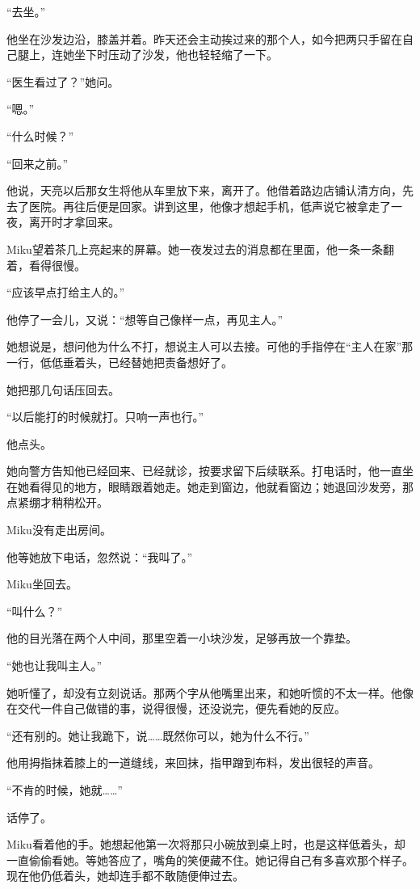 “去坐。”

他坐在沙发边沿，膝盖并着。昨天还会主动挨过来的那个人，如今把两只手留在自己腿上，连她坐下时压动了沙发，他也轻轻缩了一下。

“医生看过了？”她问。

“嗯。”

“什么时候？”

“回来之前。”

他说，天亮以后那女生将他从车里放下来，离开了。他借着路边店铺认清方向，先去了医院。再往后便是回家。讲到这里，他像才想起手机，低声说它被拿走了一夜，离开时才拿回来。

Miku望着茶几上亮起来的屏幕。她一夜发过去的消息都在里面，他一条一条翻着，看得很慢。

“应该早点打给主人的。”

他停了一会儿，又说：“想等自己像样一点，再见主人。”

她想说是，想问他为什么不打，想说主人可以去接。可他的手指停在“主人在家”那一行，低低垂着头，已经替她把责备想好了。

她把那几句话压回去。

“以后能打的时候就打。只响一声也行。”

他点头。

她向警方告知他已经回来、已经就诊，按要求留下后续联系。打电话时，他一直坐在她看得见的地方，眼睛跟着她走。她走到窗边，他就看窗边；她退回沙发旁，那点紧绷才稍稍松开。

Miku没有走出房间。

\SceneBreak

他等她放下电话，忽然说：“我叫了。”

Miku坐回去。

“叫什么？”

他的目光落在两个人中间，那里空着一小块沙发，足够再放一个靠垫。

“她也让我叫主人。”

她听懂了，却没有立刻说话。那两个字从他嘴里出来，和她听惯的不太一样。他像在交代一件自己做错的事，说得很慢，还没说完，便先看她的反应。

“还有别的。她让我跪下，说……既然你可以，她为什么不行。”

他用拇指抹着膝上的一道缝线，来回抹，指甲蹭到布料，发出很轻的声音。

“不肯的时候，她就……”

话停了。

Miku看着他的手。她想起他第一次将那只小碗放到桌上时，也是这样低着头，却一直偷偷看她。等她答应了，嘴角的笑便藏不住。她记得自己有多喜欢那个样子。现在他仍低着头，她却连手都不敢随便伸过去。


